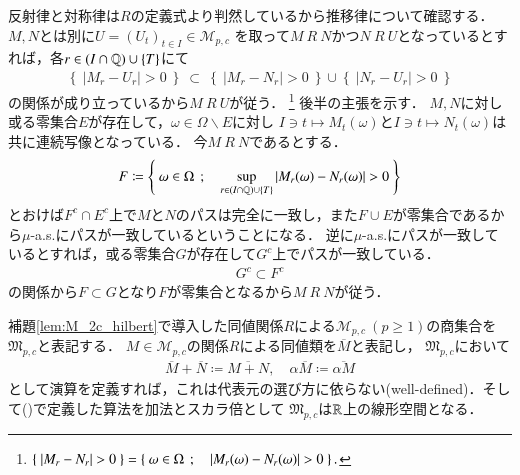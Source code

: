 	\begin{prf}
		反射律と対称律は$R$の定義式より判然しているから推移律について確認する．$M,N$とは別に$U=(U_t)_{t \in I} \in \mathcal{M}_{p,c}$
		を取って$M\ R\ N$かつ$N\ R\ U$となっているとすれば，各$r \in (I \cap \mathbb{Q}) \cup \{ T \}$にて
		\begin{align}
			\left\{\ \left|M_r - U_r\right| > 0\ \right\}\ \subset\ 
			\left\{\ \left|M_r - N_r\right| > 0\ \right\} \cup \left\{\ \left|N_r - U_r\right| > 0\ \right\}
		\end{align}
		の関係が成り立っているから$M\ R\ U$が従う．
		\footnote{
			$\left\{\ \left|M_r - N_r\right| > 0\ \right\} = \left\{\ \omega \in \Omega\ \, ; \quad \left|M_r(\omega) - N_r(\omega)\right| > 0\ \right\}.$
		}
		後半の主張を示す．
		$M,N$に対し或る零集合$E$が存在して，$\omega \in \Omega \backslash E$に対し
		$I \ni t \longmapsto M_t(\omega)$と$I \ni t \longmapsto N_t(\omega)$は共に連続写像となっている．
		今$M\ R\ N$であるとする．
		\begin{align}
			F \coloneqq \left\{\ \omega \in \Omega\ \, ; \quad \operatorname*{sup}_{r \in (I \cap \mathbb{Q}) \cup \{ T \}} \left|M_r(\omega) - N_r(\omega)\right| > 0\ \right\}
		\end{align}
		とおけば$F^c \cap E^c$上で$M$と$N$のパスは完全に一致し，また$F \cup E$が零集合であるから$\mu$-a.s.にパスが一致しているということになる．
		逆に$\mu$-a.s.にパスが一致しているとすれば，或る零集合$G$が存在して$G^c$上でパスが一致している．
		\begin{align}
			G^c \subset F^c
		\end{align}
		の関係から$F \subset G$となり$F$が零集合となるから$M\ R\ N$が従う．
		\QED
	\end{prf}
	
	\begin{screen}
		\begin{lem}
			補題\ref{lem:M_2c_hilbert}で導入した同値関係$R$による$\mathcal{M}_{p,c}\ (p \geq 1)$の商集合を$\mathfrak{M}_{p,c}$と表記する．
			$M \in \mathcal{M}_{p,c}$の関係$R$による同値類を$\overline{M}$と表記し，
			$\mathfrak{M}_{p,c}$において
			\begin{align}
				\overline{M} + \overline{N} \coloneqq \overline{M+N}, \quad \alpha \overline{M} \coloneqq \overline{\alpha M} \label{eq:mart_linear_arithmetic}
			\end{align}
			として演算を定義すれば，これは代表元の選び方に依らない(well-defined)．そして()で定義した算法を加法とスカラ倍として
			$\mathfrak{M}_{p,c}$は$\mathbb{R}$上の線形空間となる．
		\end{lem}
	\end{screen}
	

